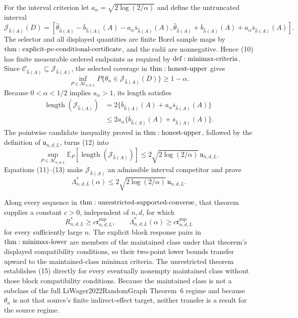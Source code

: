 For the interval criterion let \(a_\alpha=\sqrt{2\log(2/\alpha)}\) and define the untruncated interval
\[
 \mathcal J_{\widehat h(A)}(D)=
 \left[
 \widehat\theta_{\widehat h(A)}-\overline b_{\widehat h(A)}(A)
 -a_\alpha\overline s_{\widehat h(A)}(A),
 \widehat\theta_{\widehat h(A)}+\overline b_{\widehat h(A)}(A)
 +a_\alpha\overline s_{\widehat h(A)}(A)
 \right].
\tag{10}
\]
The selector and all displayed quantities are finite Borel sample maps by \({\rm thm:explicit\text{-}pc\text{-}conditional\text{-}certificate}\), and the radii are nonnegative.  Hence (10) has finite measurable ordered endpoints as required by \({\rm def:minimax\text{-}criteria}\).  Since \(\mathcal C_{\widehat h(A)}\subseteq\mathcal J_{\widehat h(A)}\), the selected coverage in \({\rm thm:honest\text{-}upper}\) gives
\[
 \inf_{P\in\mathcal M_{n,d,L}}
 P\{\theta_n\in\mathcal J_{\widehat h(A)}(D)\}\geq1-\alpha.
\tag{11}
\]
Because \(0<\alpha<1/2\) implies \(a_\alpha>1\), its length satisfies
\[
\begin{aligned}
 \operatorname{length}(\mathcal J_{\widehat h(A)})
 &=2\{\overline b_{\widehat h(A)}(A)
       +a_\alpha\overline s_{\widehat h(A)}(A)\}\\
 &\leq2a_\alpha
 \{\overline b_{\widehat h(A)}(A)+\overline s_{\widehat h(A)}(A)\}.
\end{aligned}
\tag{12}
\]
The pointwise candidate inequality proved in \({\rm thm:honest\text{-}upper}\), followed by the definition of \(\mathfrak u_{n,d,L}\), turns (12) into
\[
 \sup_{P\in\mathcal M_{n,d,L}}
 \mathbb E_P[\operatorname{length}(\mathcal J_{\widehat h(A)})]
 \leq2\sqrt{2\log(2/\alpha)}\,\mathfrak u_{n,d,L}.
\tag{13}
\]
Equations (11)--(13) make \(\mathcal J_{\widehat h(A)}\) an admissible interval competitor and prove
\[
 \Lambda^*_{n,d,L}(\alpha)
 \leq2\sqrt{2\log(2/\alpha)}\,\mathfrak u_{n,d,L}.
\tag{14}
\]

Along every sequence in \({\rm thm:unrestricted\text{-}supported\text{-}converse}\), that theorem supplies a constant \(c>0\), independent of \(n,d\), for which
\[
 R^*_{n,d,L}\geq c\mathfrak r^{\mathrm{sup}}_{n,d,L},
 \qquad
 \Lambda^*_{n,d,L}(\alpha)
 \geq c\mathfrak r^{\mathrm{sup}}_{n,d,L}
\tag{15}
\]
for every sufficiently large \(n\).  The explicit block response pairs in \({\rm thm:minimax\text{-}lower}\) are members of the maintained class under that theorem's displayed compatibility conditions, so their two-point lower bounds transfer upward to the maintained-class minimax criteria.  The unrestricted theorem establishes (15) directly for every eventually nonempty maintained class without those block compatibility conditions.  Because the maintained class is not a subclass of the full LiWager2022RandomGraph Theorem~6 regime and because \(\theta_n\) is not that source's finite indirect-effect target, neither transfer is a result for the source regime.

